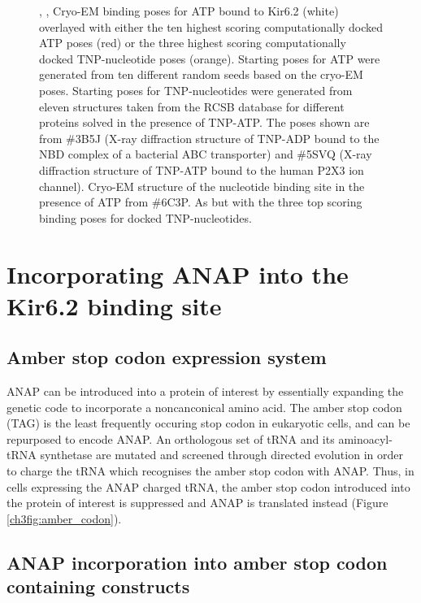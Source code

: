 \begin{figure}[h]
	\caption[TNP-nucleotides can bind with a similar pose to ATP]{
	, ,  Cryo-EM binding poses for ATP bound to Kir6.2 (white) overlayed with either the ten highest scoring computationally docked ATP poses (red) or the three highest scoring computationally docked TNP-nucleotide poses (orange).
	Starting poses for ATP were generated from ten different random seeds based on the cryo-EM poses.
	Starting poses for TNP-nucleotides were generated from eleven structures taken from the RCSB database for different proteins solved in the presence of TNP-ATP.
	The poses shown are from \#3B5J (X-ray diffraction structure of TNP-ADP bound to the NBD complex of a bacterial ABC transporter) and \#5SVQ (X-ray diffraction structure of TNP-ATP bound to the human P2X3 ion channel).
	 Cryo-EM structure of the nucleotide binding site in the presence of ATP from \#6C3P.
	 As  but with the three top scoring binding poses for docked TNP-nucleotides.
	}\label{ch3fig:docking}
\end{figure}

\section{Incorporating ANAP into the Kir6.2 binding site}

\subsection{Amber stop codon expression system}

ANAP can be introduced into a protein of interest by essentially expanding the genetic code to incorporate a noncanconical amino acid.
The amber stop codon (TAG) is the least frequently occuring stop codon in eukaryotic cells, and can be repurposed to encode ANAP.
An orthologous set of tRNA and its aminoacyl-tRNA synthetase are mutated and screened through directed evolution in order to charge the tRNA which recognises the amber stop codon with ANAP.
Thus, in cells expressing the ANAP charged tRNA, the amber stop codon introduced into the protein of interest is suppressed and ANAP is translated instead (Figure \ref{ch3fig:amber_codon}).

\subsection{ANAP incorporation into amber stop codon containing constructs}

